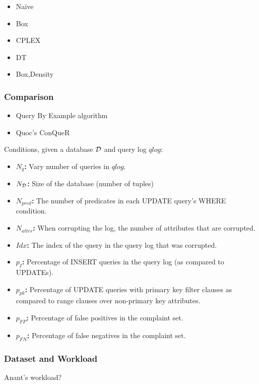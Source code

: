 \begin{itemize}
\item Naive
\item Box
\item CPLEX
\item DT
\item Box,Density
\end{itemize}



\subsubsection{Comparison}

\begin{itemize}
\item Query By Example algorithm
\item Quoc's ConQueR
\end{itemize}

Conditions, given a database ${\cal D}$ and query log $qlog$:

\begin{itemize}
\item {\bf $N_q$:} Vary number of queries in $qlog$.
\item {\bf $N_{\cal D}$: } Size of the database (number of tuples)
\item {\bf $N_{pred}$:} The number of predicates in each UPDATE query's WHERE condition.
\item {\bf $N_{attrs}$: } When corrupting the log, the number of attributes that are corrupted.
\item {\bf $Idx$: } The index of the query in the query log that was corrupted.
\item {\bf $p_{I}$: } Percentage of INSERT queries in the query log (as compared to UPDATEs).
\item {\bf $p_{pk}$: } Percentage of UPDATE queries with primary key filter clauses as compared to range clauses over non-primary key attributes.
\item {\bf $p_{FP}$: } Percentage of false positives in the complaint set.
\item {\bf $p_{FN}$: } Percentage of false negatives in the complaint set.
\end{itemize}

\subsubsection{Dataset and Workload}

Anant's workload?

